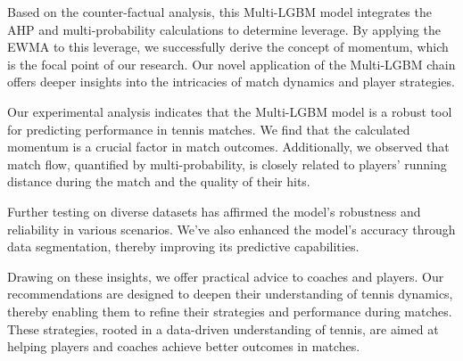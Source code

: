 \documentclass{mcmthesis}
\begin{document}
Based on the counter-factual analysis, this Multi-LGBM model integrates the AHP and multi-probability calculations to determine leverage. By applying the EWMA to this leverage, we successfully derive the concept of momentum, which is the focal point of our research. Our novel application of the Multi-LGBM chain offers deeper insights into the intricacies of match dynamics and player strategies.

Our experimental analysis indicates that the Multi-LGBM model is a robust tool for predicting performance in tennis matches. We find that the calculated momentum is a crucial factor in match outcomes. Additionally, we observed that match flow, quantified by multi-probability, is closely related to players' running distance during the match and the quality of their hits.

Further testing on diverse datasets has affirmed the model's robustness and reliability in various scenarios. We've also enhanced the model's accuracy through data segmentation, thereby improving its predictive capabilities.

Drawing on these insights, we offer practical advice to coaches and players. Our recommendations are designed to deepen their understanding of tennis dynamics, thereby enabling them to refine their strategies and performance during matches. These strategies, rooted in a data-driven understanding of tennis, are aimed at helping players and coaches achieve better outcomes in matches.
\end{document}
